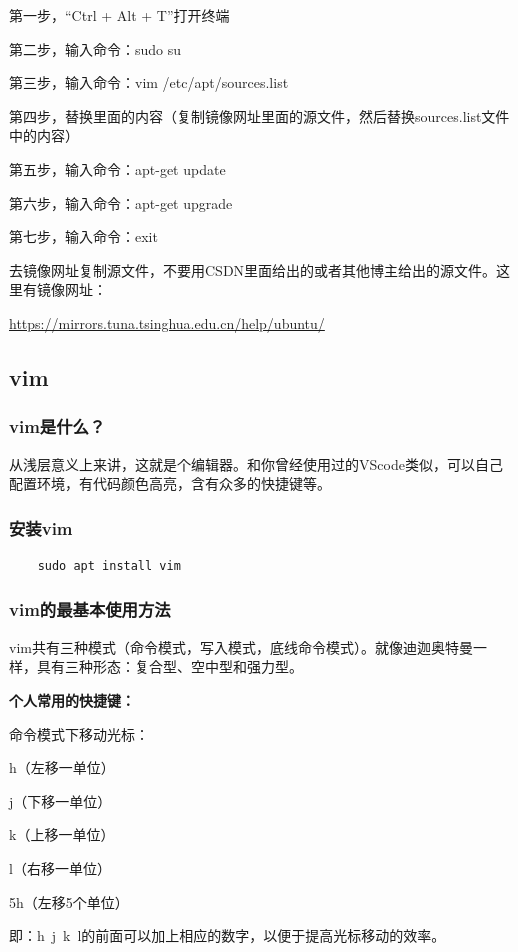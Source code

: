 \documentclass[12pt]{article}
\begin{document}
第一步，“Ctrl + Alt + T”打开终端

第二步，输入命令：sudo su

第三步，输入命令：vim /etc/apt/sources.list

第四步，替换里面的内容（复制镜像网址里面的源文件，然后替换sources.list文件中的内容）

第五步，输入命令：apt-get update

第六步，输入命令：apt-get upgrade

第七步，输入命令：exit


去镜像网址复制源文件，不要用CSDN里面给出的或者其他博主给出的源文件。这里有镜像网址：

\href{https://mirrors.tuna.tsinghua.edu.cn/help/ubuntu/}{https://mirrors.tuna.tsinghua.edu.cn/help/ubuntu/}

\subsection{vim}

\subsubsection{vim是什么？}
从浅层意义上来讲，这就是个编辑器。和你曾经使用过的VScode类似，可以自己配置环境，有代码颜色高亮，含有众多的快捷键等。
\subsubsection{安装vim}
\begin{verbatim}
    sudo apt install vim
\end{verbatim}


\subsubsection{vim的最基本使用方法}
vim共有三种模式（命令模式，写入模式，底线命令模式）。就像迪迦奥特曼一样，具有三种形态：复合型、空中型和强力型。


\noindent \textbf{个人常用的快捷键：}

命令模式下移动光标：

h（左移一单位）

j（下移一单位）

k（上移一单位）

l（右移一单位）

5h（左移5个单位）

即：h~j~k~l的前面可以加上相应的数字，以便于提高光标移动的效率。
\end{document}
